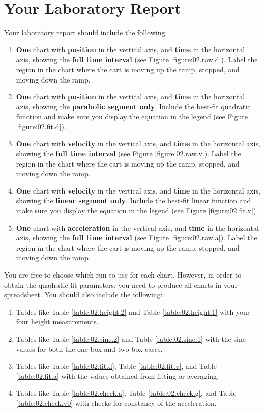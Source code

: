 \section{Your Laboratory Report}
%
Your laboratory report should include the following:
\begin{enumerate}
    \item \textbf{One} chart with \textbf{position} in the vertical axis, and \textbf{time} in the horizontal axis, showing the \textbf{full time interval} (see Figure \ref{figure:02.raw.d}). Label the region in the chart where the cart is moving up the ramp, stopped, and moving down the ramp.
    \item \textbf{One} chart with \textbf{position} in the vertical axis, and \textbf{time} in the horizontal axis, showing the \textbf{parabolic segment only}. Include the best-fit quadratic function and make sure you display the equation in the legend (see Figure \ref{figure:02.fit.d}). 
    \item \textbf{One} chart with \textbf{velocity} in the vertical axis, and \textbf{time} in the horizontal axis, showing the \textbf{full time interval} (see Figure \ref{figure:02.raw.v}). Label the region in the chart where the cart is moving up the ramp, stopped, and moving down the ramp.
    \item \textbf{One} chart with \textbf{velocity} in the vertical axis, and \textbf{time} in the horizontal axis, showing the \textbf{linear segment only}. Include the best-fit linear function and make sure you display the equation in the legend (see Figure \ref{figure:02.fit.v}).
    \item \textbf{One} chart with \textbf{acceleration} in the vertical axis, and \textbf{time} in the horizontal axis, showing the \textbf{full time interval} (see Figure \ref{figure:02.raw.a}). Label the region in the chart where the cart is moving up the ramp, stopped, and moving down the ramp.
\end{enumerate}
You are free to choose which run to use for each chart. However, in order to obtain the quadratic fit parameters, you need to produce all charts in your spreadsheet. You should also include the following:
\begin{enumerate}
    \item Tables like Table \ref{table:02.height.2} and Table \ref{table:02.height.1} with your four height measurements.
    \item Tables like Table \ref{table:02.sine.2} and Table \ref{table:02.sine.1} with the sine values for both the one-box and two-box cases.
    \item Tables like Table \ref{table:02.fit.d}, Table \ref{table:02.fit.v}, and Table \ref{table:02.fit.a} with the values obtained from fitting or averaging.
    \item Tables like Table \ref{table:02.check.a}, Table \ref{table:02.check.g}, and Table \ref{table:02.check.v0} with checks for constancy of the acceleration.
\end{enumerate}
%
\newpage
